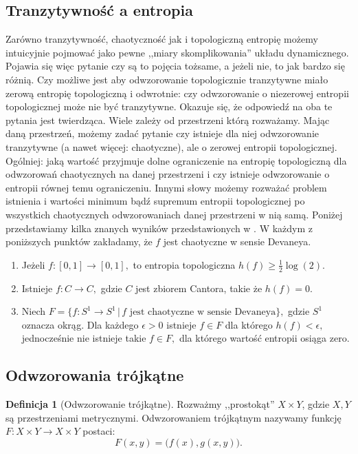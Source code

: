 \documentclass[licencjacka]{pwr_wmat_praca_dyplomowa}
\theoremstyle{plain}
\numberwithin{theorem}{chapter}
\theoremstyle{definition}
\numberwithin{theorem}{chapter}
\newtheorem{definition}[theorem]{Definicja}
\begin{document}
\subsection{Tranzytywność a entropia}

Zarówno tranzytywność, chaotyczność jak i topologiczną entropię możemy intuicyjnie pojmować jako pewne ,,miary skomplikowania'' układu dynamicznego. Pojawia się więc pytanie czy są to pojęcia tożsame, a jeżeli nie, to jak bardzo się różnią. Czy możliwe jest aby odwzorowanie topologicznie tranzytywne miało zerową entropię topologiczną i odwrotnie: czy odwzorowanie o niezerowej entropii topologicznej może nie być tranzytywne. Okazuje się, że odpowiedź na oba te pytania jest twierdząca. Wiele zależy od przestrzeni którą rozważamy.
Mając daną przestrzeń, możemy zadać pytanie czy istnieje dla niej odwzorowanie tranzytywne (a nawet więcej: chaotyczne), ale o zerowej entropii topologicznej. Ogólniej: jaką wartość przyjmuje dolne ograniczenie na entropię topologiczną dla odwzorowań chaotycznych na danej przestrzeni i czy istnieje odwzorowanie o entropii równej temu ograniczeniu. Innymi słowy możemy rozważać problem istnienia i wartości minimum bądź supremum entropii topologicznej po wszystkich chaotycznych odwzorowaniach danej przestrzeni w nią samą. Poniżej przedstawiamy kilka znanych wyników przedstawionych w \cite{balibrea2003topological}.
W każdym z poniższych punktów zakładamy, że $f$ jest chaotyczne w sensie Devaneya.
\begin{enumerate}
\item Jeżeli $f: [0,1] \rightarrow [0,1],$ to entropia topologiczna $h(f) \geq \frac{1}{2} \log(2)$.
\item Istnieje $f: C \rightarrow C,$ gdzie $C$ jest zbiorem Cantora, takie że $h(f) = 0.$
\item Niech $F = \{f : S^1 \rightarrow S^1 \, | \, f \textrm{ jest chaotyczne w sensie Devaneya}\},$ gdzie $S^1$ oznacza okrąg. Dla każdego $\epsilon > 0$ istnieje $f \in F$ dla którego $h(f) < \epsilon,$ jednocześnie nie istnieje takie $f \in F,$ dla którego wartość entropii osiąga zero.
\end{enumerate}



\subsection{Odwzorowania trójkątne}


\begin{definition}[Odwzorowanie trójkątne]
Rozważmy ,,prostokąt'' $X \times Y$, gdzie $X, Y$ są przestrzeniami metrycznymi. 
Odwzorowaniem trójkątnym nazywamy funkcję $F: X \times Y \rightarrow X \times Y$ postaci:
$$F(x,y) = \big(f(x), g(x,y)\big).$$
\end{definition}
\end{document}
